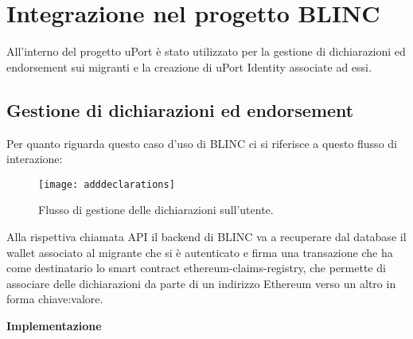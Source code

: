 \section{Integrazione nel progetto BLINC}

All’interno del progetto uPort è stato utilizzato per la gestione di dichiarazioni
ed endorsement sui migranti e la creazione di uPort Identity associate ad essi.

\subsection{Gestione di dichiarazioni ed endorsement}
Per quanto riguarda questo caso d’uso di BLINC ci si
riferisce a questo flusso di interazione:

\begin{figure}[!ht]
    \texttt{[image: adddeclarations]}
    \caption{Flusso di gestione delle dichiarazioni sull'utente.}
    \label{fig:adddeclarations}
  \end{figure}

Alla rispettiva chiamata API il backend di BLINC va a recuperare dal database
il wallet associato al migrante che si è autenticato e firma una transazione
che ha come destinatario lo smart contract ethereum-claims-registry, che permette
di associare delle dichiarazioni da parte di un indirizzo Ethereum 
verso un altro in forma chiave:valore.

\textbf{Implementazione}

